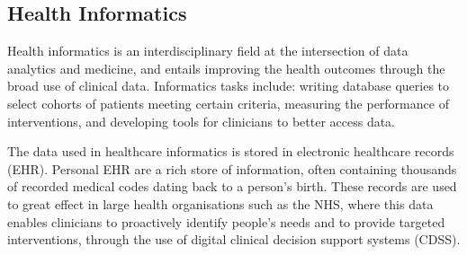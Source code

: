 \documentclass[11pt]{article}
\begin{document}


\subsection{Health Informatics}
Health informatics is an interdisciplinary field at the intersection of data analytics and medicine, and entails improving the health outcomes through the broad use of clinical data. Informatics tasks include: writing database queries to select cohorts of patients meeting certain criteria, measuring the performance of interventions, and developing tools for clinicians to better access data. 

The data used in healthcare informatics is stored in electronic healthcare records (EHR). Personal EHR are a rich store of information, often containing thousands of recorded medical codes dating back to a person's birth. These records are used to great effect in large health organisations such as the NHS, where this data enables clinicians to proactively identify people's needs and to provide targeted interventions, through the use of digital clinical decision support systems (CDSS).



\end{document}
